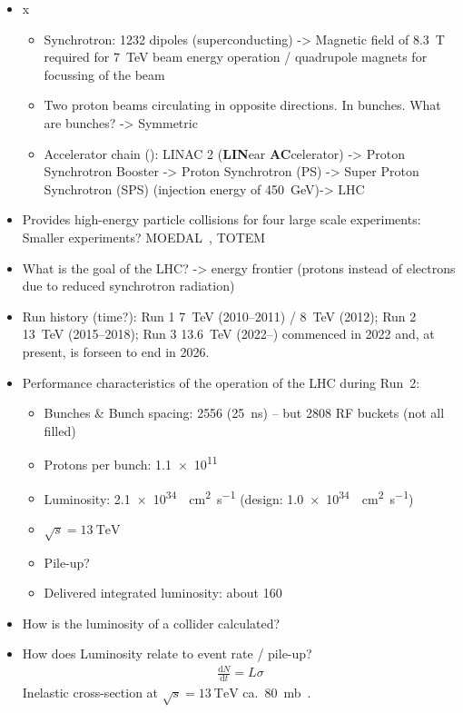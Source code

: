 \begin{itemize}
\item x
  \begin{itemize}

  \item Synchrotron: 1232 dipoles (superconducting) -> Magnetic field of
    \SI{8.3}{\tesla} required for \SI{7}{\TeV} beam energy operation /
    quadrupole magnets for focussing of the beam

  \item Two proton beams circulating in opposite directions. In bunches. What
    are bunches? -> Symmetric

  \item Accelerator chain (\pp): LINAC 2 (\textbf{LIN}ear \textbf{AC}celerator)
    -> Proton Synchrotron Booster -> Proton Synchrotron (PS) -> Super Proton
    Synchrotron (SPS) (injection energy of \SI{450}{\GeV})-> LHC
  \end{itemize}

\item Provides high-energy particle collisions for four large scale experiments:
  Smaller experiments?  MOEDAL~\cite{MoEDAL:2009jwa},
  TOTEM~\cite{TOTEM:2008lue}

\item What is the goal of the LHC? -> energy frontier (protons instead of
  electrons due to reduced synchrotron radiation)

\item Run history (time?): Run 1 \SI{7}{\TeV} (2010--2011) / \SI{8}{\TeV}
  (2012); Run 2 \SI{13}{\TeV} (2015--2018); Run 3 \SI{13.6}{\TeV} (2022--)
  commenced in 2022 and, at present, is forseen to end in 2026.

\item Performance characteristics of the \pp operation of the LHC during Run~2:

  \begin{itemize}
  \item Bunches \& Bunch spacing: 2556 (\SI{25}{\nano\second}) -- but 2808 RF
    buckets (not all filled)
  \item Protons per bunch: \num{1.1e11}
  \item Luminosity: \SI{2.1e34}{\per\centi\metre\squared\per\second} (design:
    \SI{1.0e34}{\per\centi\metre\squared\per\second})
  \item $\sqrt{s} = \SI{13}{\TeV}$
  \item Pile-up?
  \item Delivered integrated luminosity: about \SI{160}{\ifb}
    \end{itemize}

\item How is the luminosity of a collider calculated?

\item How does Luminosity relate to event rate / pile-up?
  \begin{align*}
    \frac{\mathrm{d}N}{\mathrm{d}t} = L \sigma
  \end{align*}
  Inelastic \pp cross-section at $\sqrt{s} = \SI{13}{\TeV}$ ca.\
  \SI{80}{\milli\barn}~\cite{STDM-2015-05}.

\end{itemize}

